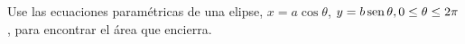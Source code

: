 \item Use las ecuaciones paramétricas de una elipse, $x = a\cos\theta$, $y = b\operatorname{sen}\theta, 0 \le \theta \le 2\pi$, para encontrar el área que encierra.
